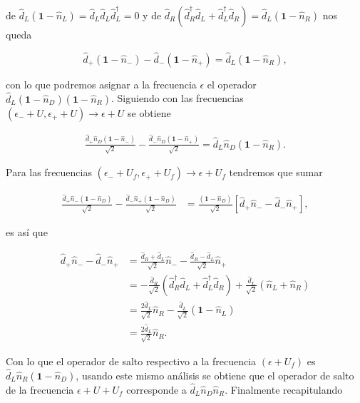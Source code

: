 \begin{appendixs}
de $\hat{d}_{L}(\textbf{1} - \hat{n}_{L}) = \hat{d}_{L}\hat{d}_{L}\hat{d}^{\dagger}_{L} = 0$ y de $\hat{d}_{R}(\hat{d}^{\dagger}_{R}\hat{d}_{L} + \hat{d}^{\dagger}_{L}\hat{d}_{R}) = \hat{d}_{L}(\textbf{1}-\hat{n}_{R})$ nos queda

\begin{equation*}
    \hat{d}_{+}(\textbf{1}-\hat{n}_{-}) - \hat{d}_{-}(\textbf{1}-\hat{n}_{+})  = \hat{d}_{L}(\textbf{1} - \hat{n}_{R}),
\end{equation*}

con lo que podremos asignar a la frecuencia $\epsilon$ el operador $\hat{d}_{L}(\textbf{1}-\hat{n}_{D})(\textbf{1}-\hat{n}_{R})$. Siguiendo con las frecuencias $(\epsilon_{-}+U,\epsilon_{+}+U) \to \epsilon + U$ se obtiene

\begin{align*}
    \frac{\hat{d}_{+}\hat{n}_{D}(\textbf{1}-\hat{n}_{-})}{\sqrt{2}} - \frac{\hat{d}_{-}\hat{n}_{D}(\textbf{1}-\hat{n}_{+})}{\sqrt{2}} = \hat{d}_{L}\hat{n}_{D}(\textbf{1}-\hat{n}_{R}). 
\end{align*}

Para las frecuencias $(\epsilon_{-}+U_{f},\epsilon_{+}+U_{f}) \to \epsilon+U_{f}$ tendremos que sumar

\begin{align*}
    \frac{\hat{d}_{+}\hat{n}_{-}(\textbf{1}-\hat{n}_{D})}{\sqrt{2}} - \frac{\hat{d}_{-}\hat{n}_{+}(\textbf{1}-\hat{n}_{D})}{\sqrt{2}} & = \frac{(\textbf{1}-\hat{n}_{D})}{\sqrt{2}}[\hat{d}_{+}\hat{n}_{-} -\hat{d}_{-}\hat{n}_{+}],
\end{align*}

es así que

\begin{align*}
    \hat{d}_{+}\hat{n}_{-} -\hat{d}_{-}\hat{n}_{+} & = \frac{\hat{d}_{R}+\hat{d}_{L}}{\sqrt{2}}\hat{n}_{-} - \frac{\hat{d}_{R}-\hat{d}_{L}}{\sqrt{2}}\hat{n}_{+} \\
    & = - \frac{\hat{d}_{R}}{\sqrt{2}}(\hat{d}^{\dagger}_{R}\hat{d}_{L}+ \hat{d}^{\dagger}_{L}\hat{d}_{R}) + \frac{\hat{d}_{L}}{\sqrt{2}}(\hat{n}_{L}+\hat{n}_{R}) \\
    & = \frac{2\hat{d}_{L}}{\sqrt{2}}\hat{n}_{R} - \frac{\hat{d}_{L}}{\sqrt{2}}(\textbf{1}-\hat{n}_{L}) \\
    & = \frac{2\hat{d}_{L}}{\sqrt{2}}\hat{n}_{R}.
\end{align*}

Con lo que el operador de salto respectivo a la frecuencia $(\epsilon+U_{f})$ es $\hat{d}_{L}\hat{n}_{R}(\textbf{1}-\hat{n}_{D})$, usando este mismo análisis se obtiene que el operador de salto de la frecuencia $\epsilon+U+U_{f}$ corresponde a $\hat{d}_{L}\hat{n}_{D}\hat{n}_{R}$. Finalmente recapitulando


\end{appendixs}
